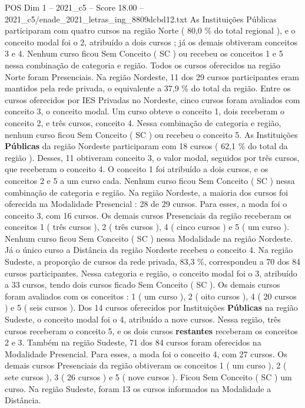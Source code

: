\begin{textsample}{POS Dim 1 – 2021\_c5 – Score 18.00 – 2021\_c5/enade\_2021\_letras\_ing\_8809dcbd12.txt}
As Instituições Públicas participaram com quatro cursos na região Norte ( 80,0 \% do total regional ), e o conceito modal foi o 2, atribuído a dois cursos ; já os demais obtiveram conceitos 3 e 4.
Nenhum curso ficou Sem Conceito ( SC ) ou recebeu os conceitos 1 e 5 nessa combinação de categoria e região.
Todos os cursos oferecidos na região Norte foram Presenciais.
Na região Nordeste, 11 dos 29 cursos participantes eram mantidos pela rede privada, o equivalente a 37,9 \% do total da região.
Entre os cursos oferecidos por IES Privadas no Nordeste, cinco cursos foram avaliados com conceito 3, o conceito modal.
Um curso obteve o conceito 1, dois receberam o conceito 2, e três cursos, conceito 4.
Nessa combinação de categoria e região, nenhum curso ficou Sem Conceito ( SC ) ou recebeu o conceito 5.
As Instituições \textbf{Públicas} da região Nordeste participaram com 18 cursos ( 62,1 \% do total da região ).
Desses, 11 obtiveram conceito 3, o valor modal, seguidos por três cursos, que receberam o conceito 4.
O conceito 1 foi atribuído a dois cursos, e os conceitos 2 e 5 a um curso cada.
Nenhum curso ficou Sem Conceito ( SC ) nessa combinação de categoria e região.
Na região Nordeste, a maioria dos cursos foi oferecida na Modalidade Presencial : 28 de 29 cursos.
Para esses, a moda foi o conceito 3, com 16 cursos.
Os demais cursos Presenciais da região receberam os conceitos 1 ( três cursos ), 2 ( três cursos ), 4 ( cinco cursos ) e 5 ( um curso ).
Nenhum curso ficou Sem Conceito ( SC ) nessa Modalidade na região Nordeste.
Já o único curso a Distância da região Nordeste recebeu o conceito 4.
Na região Sudeste, a proporção de cursos da rede privada, 83,3 \%, correspondeu a 70 dos 84 cursos participantes.
Nessa categoria e região, o conceito modal foi o 3, atribuído a 33 cursos, tendo dois cursos ficado Sem Conceito ( SC ).
Os demais cursos foram avaliados com os conceitos : 1 ( um curso ), 2 ( oito cursos ), 4 ( 20 cursos ) e 5 ( seis cursos ).
Dos 14 cursos oferecidos por Instituições \textbf{Públicas} na região Sudeste, o conceito modal foi o 4, atribuído a nove cursos.
Nessa região, três cursos receberam o conceito 5, e os dois cursos \textbf{restantes} receberam os conceitos 2 e 3.
Também na região Sudeste, 71 dos 84 cursos foram oferecidos na Modalidade Presencial.
Para esses, a moda foi o conceito 4, com 27 cursos.
Os demais cursos Presenciais da região obtiveram os conceitos 1 ( um curso ), 2 ( sete cursos ), 3 ( 26 cursos ) e 5 ( nove cursos ).
Ficou Sem Conceito ( SC ) um curso.
Na região Sudeste, foram 13 os cursos informados na Modalidade a Distância.

\end{textsample}
